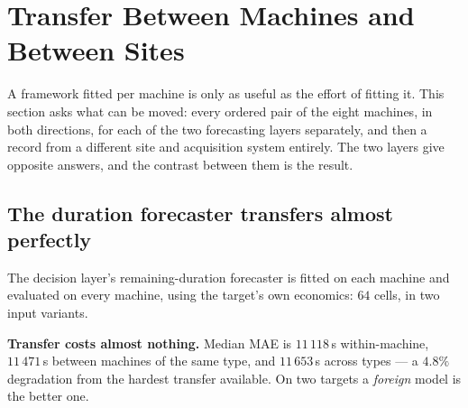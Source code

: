 %
%
%
%

\section{Transfer Between Machines and Between Sites}
\label{sec:crossmachine}

A framework fitted per machine is only as useful as the effort of
fitting it. This section asks what can be moved: every ordered pair of
the eight machines, in both directions, for each of the two forecasting
layers separately, and then a record from a different site and
acquisition system entirely. The two layers give opposite answers, and
the contrast between them is the result.

\subsection{The duration forecaster transfers almost perfectly}
\label{sec:crossmachine:decision}

The decision layer's remaining-duration forecaster is fitted on each
machine and evaluated on every machine, using the target's own
economics: $64$ cells, in two input variants.

\textbf{Transfer costs almost nothing.} Median MAE is $11\,118$\,s
within-machine, $11\,471$\,s between machines of the same type, and
$11\,653$\,s across types --- a $4.8\%$ degradation from the hardest
transfer available. On two targets a \emph{foreign} model is the better
one.

